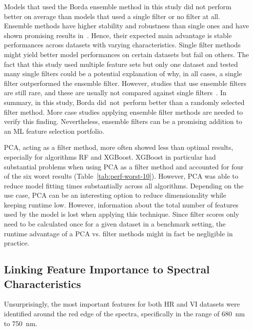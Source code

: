 \documentclass[remotesensing,article,accept,moreauthors,pdftex]{Definitions/mdpi}
\begin{document}
\begin{paracol}{2}
Models that used the Borda ensemble method in this study did not perform better on average than models that used a single filter or no filter at all.
Ensemble methods have higher stability and robustness than single ones and have shown promising results in~\cite{drotar2017}.
Hence, their expected main advantage is stable performances across datasets with varying characteristics.
Single filter methods might yield better model performances on certain datasets but fail on others.
The fact that this study used multiple feature sets but only one dataset and tested many single filters could be a potential explanation of why, in all cases, a single filter outperformed the ensemble filter.
However, studies that use ensemble filters are still rare, and these are usually not compared against single filters~\cite{ghosh2019}.
In summary, in this study, Borda did\ not\ perform better than a randomly selected filter method.
More case studies applying ensemble filter methods are needed to verify this finding.
Nevertheless, ensemble filters can be a promising addition to an ML feature selection portfolio.

PCA, acting as a filter method, more often showed less than optimal results, especially for algorithms RF and XGBoost.
XGBoost in particular had substantial problems when using PCA as a filter method and accounted for four of the six worst results (Table~\ref{tab:perf-worst-10}).
However, PCA was able to reduce model fitting times substantially across all algorithms.
Depending on the use case, PCA can be an interesting option to reduce dimensionality while keeping runtime low.
However, information about the total number of features used by the model is lost when applying this technique.
Since filter scores only need to be calculated once for a given dataset in a benchmark setting, the runtime advantage of a PCA vs. filter methods might in fact be negligible in practice.

\subsection{Linking Feature Importance to Spectral Characteristics}

Unsurprisingly, the most important features for both HR and VI datasets were identified around the red edge of the spectra, specifically in the range of 680~nm to 750~nm.


\end{paracol}
\end{document}
